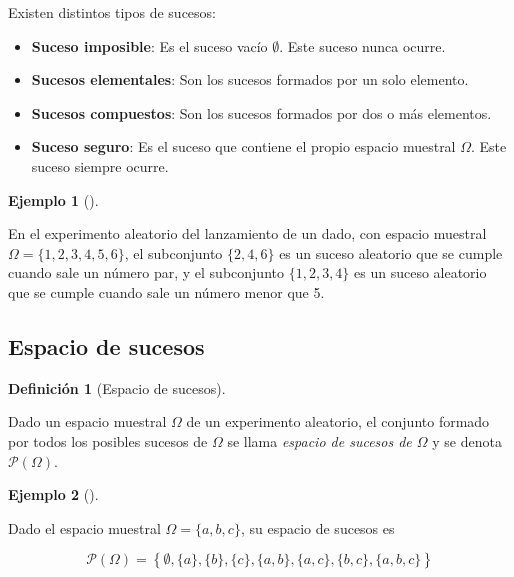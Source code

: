 \documentclass[
  spanish,
  a4paper,
]{scrreport}
\providecommand{\tightlist}{%
  \setlength{\itemsep}{0pt}\setlength{\parskip}{0pt}}
\theoremstyle{plain}
\theoremstyle{definition}
\newtheorem{example}{Ejemplo}[chapter]
\theoremstyle{definition}
\newtheorem{definition}{Definición}[chapter]
\theoremstyle{remark}
\begin{document}
Existen distintos tipos de sucesos:

\begin{itemize}
\tightlist
\item
  \textbf{Suceso imposible}: Es el suceso vacío \(\emptyset\). Este
  suceso nunca ocurre.
\item
  \textbf{Sucesos elementales}: Son los sucesos formados por un solo
  elemento.
\item
  \textbf{Sucesos compuestos}: Son los sucesos formados por dos o más
  elementos.
\item
  \textbf{Suceso seguro}: Es el suceso que contiene el propio espacio
  muestral \(\Omega\). Este suceso siempre ocurre.
\end{itemize}

\begin{example}[]\protect\hypertarget{exm-sucesos-aleatorios}{}\label{exm-sucesos-aleatorios}

En el experimento aleatorio del lanzamiento de un dado, con espacio
muestral \(\Omega=\{1, 2, 3, 4, 5, 6\}\), el subconjunto \(\{2, 4, 6\}\)
es un suceso aleatorio que se cumple cuando sale un número par, y el
subconjunto \(\{1, 2, 3, 4\}\) es un suceso aleatorio que se cumple
cuando sale un número menor que 5.

\end{example}

\subsection{Espacio de sucesos}\label{espacio-de-sucesos}

\begin{definition}[Espacio de
sucesos]\protect\hypertarget{def-espacio-sucesos}{}\label{def-espacio-sucesos}

Dado un espacio muestral \(\Omega\) de un experimento aleatorio, el
conjunto formado por todos los posibles sucesos de \(\Omega\) se llama
\emph{espacio de sucesos de \(\Omega\)} y se denota
\(\mathcal{P}(\Omega)\).

\end{definition}

\begin{example}[]\protect\hypertarget{exm-espacio-sucesos}{}\label{exm-espacio-sucesos}

Dado el espacio muestral \(\Omega=\{a,b,c\}\), su espacio de sucesos es

\[\mathcal{P}(\Omega)=\left\{\emptyset, \{a\},\{b\},\{c\},\{a,b\},\{a,c\},\{b,c\},\{a,b,c\}\right\}\]

\end{example}
\end{document}

